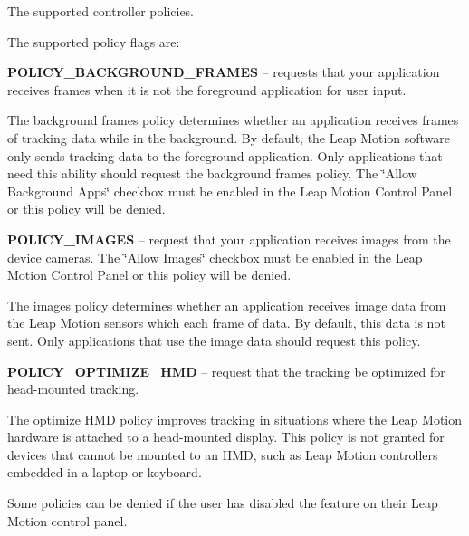 The supported controller policies.

The supported policy flags are\+:

{\bfseries P\+O\+L\+I\+C\+Y\+\_\+\+B\+A\+C\+K\+G\+R\+O\+U\+N\+D\+\_\+\+F\+R\+A\+M\+ES} -- requests that your application receives frames when it is not the foreground application for user input.

The background frames policy determines whether an application receives frames of tracking data while in the background. By default, the Leap Motion software only sends tracking data to the foreground application. Only applications that need this ability should request the background frames policy. The \char`\"{}\+Allow Background Apps\char`\"{} checkbox must be enabled in the Leap Motion Control Panel or this policy will be denied.

{\bfseries P\+O\+L\+I\+C\+Y\+\_\+\+I\+M\+A\+G\+ES} -- request that your application receives images from the device cameras. The \char`\"{}\+Allow Images\char`\"{} checkbox must be enabled in the Leap Motion Control Panel or this policy will be denied.

The images policy determines whether an application receives image data from the Leap Motion sensors which each frame of data. By default, this data is not sent. Only applications that use the image data should request this policy.

{\bfseries P\+O\+L\+I\+C\+Y\+\_\+\+O\+P\+T\+I\+M\+I\+Z\+E\+\_\+\+H\+MD} -- request that the tracking be optimized for head-\/mounted tracking.

The optimize H\+MD policy improves tracking in situations where the Leap Motion hardware is attached to a head-\/mounted display. This policy is not granted for devices that cannot be mounted to an H\+MD, such as Leap Motion controllers embedded in a laptop or keyboard.

Some policies can be denied if the user has disabled the feature on their Leap Motion control panel.

